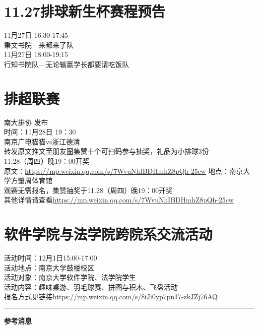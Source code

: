\documentclass[letterpaper, 12pt]{article}
\begin{document}
\begin{multicols}{2}
\section{11.27排球新生杯赛程预告}
11月27日 16:30-17:45\\
秉文书院—来都来了队\\
11月27日 18:00-19:15\\
行知书院队—无论输赢学长都要请吃饭队

\section{排超联赛}
南大排协 发布\\
时间：11月28日 19：30\\
南京广电猫猫vs浙江德清\\
转发原文推文至朋友圈集赞十个可扫码参与抽奖，礼品为小排球3份\\
11.28（周四）晚19：00开奖\\
原文：\url{https://mp.weixin.qq.com/s/7WvuNhIBDHmhZ8pQh-25cw}
地点：南京大学方肇周体育馆\\
观赛无需报名，集赞抽奖于11.28（周四）晚19：00开奖\\
其他详情请查看\url{https://mp.weixin.qq.com/s/7WvuNhIBDHmhZ8pQh-25cw}\\
\section{软件学院与法学院跨院系交流活动}
活动时间：12月1日15:00-17:00\\
活动地点：南京大学鼓楼校区\\
活动对象：南京大学软件学院、法学院学生\\
活动内容：趣味桌游、羽毛球赛、拼图与积木、飞盘活动\\
报名方式见链接\url{https://mp.weixin.qq.com/s/8iJi0yp7pn17-zkJZj76AQ}


\end{multicols} 
\hrule
\vspace{4mm}
\centerline{\huge\textbf{参考消息}}
\end{document}
